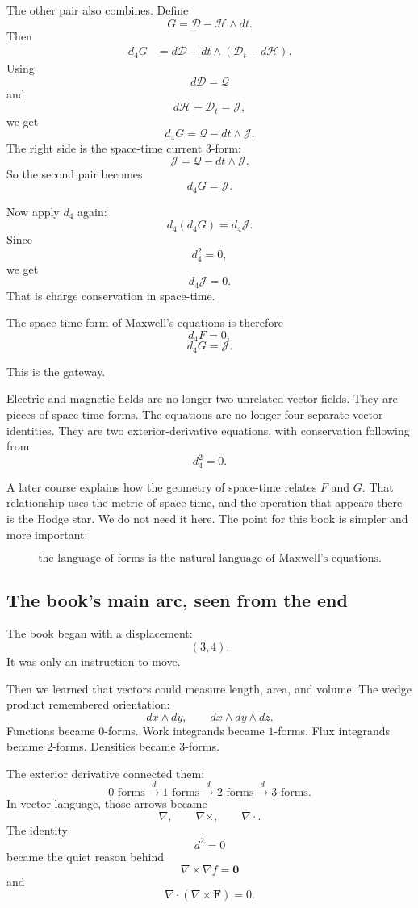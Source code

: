 The other pair also combines.  Define
\[
\boxed{
    G=\mathcal D-\mathcal H\wedge dt.
}
\]
Then
\[
\begin{aligned}
d_4G
&=
d\mathcal D
+
dt\wedge(\mathcal D_t-d\mathcal H).
\end{aligned}
\]
Using
\[
    d\mathcal D=\mathcal Q
\]
and
\[
    d\mathcal H-\mathcal D_t=\mathcal J,
\]
we get
\[
\boxed{
    d_4G=\mathcal Q-dt\wedge\mathcal J.
}
\]
The right side is the space-time current \(3\)-form:
\[
\boxed{
    \mathscr J=\mathcal Q-dt\wedge\mathcal J.
}
\]
So the second pair becomes
\[
\boxed{
    d_4G=\mathscr J.
}
\]

Now apply \(d_4\) again:
\[
    d_4(d_4G)=d_4\mathscr J.
\]
Since
\[
    d_4^2=0,
\]
we get
\[
\boxed{
    d_4\mathscr J=0.
}
\]
That is charge conservation in space-time.

The space-time form of Maxwell's equations is therefore
\[
\boxed{
    d_4F=0,
}
\]
\[
\boxed{
    d_4G=\mathscr J.
}
\]

This is the gateway.

Electric and magnetic fields are no longer two unrelated vector fields.  They are pieces
of space-time forms.  The equations are no longer four separate vector identities.  They
are two exterior-derivative equations, with conservation following from
\[
    d_4^2=0.
\]

A later course explains how the geometry of space-time relates \(F\) and \(G\).  That
relationship uses the metric of space-time, and the operation that appears there is the
Hodge star.  We do not need it here.  The point for this book is simpler and more
important:

\[
\boxed{
    \text{the language of forms is the natural language of Maxwell's equations.}
}
\]

\subsection{The book's main arc, seen from the end}

The book began with a displacement:
\[
    (3,4).
\]
It was only an instruction to move.

Then we learned that vectors could measure length, area, and volume.  The wedge
product remembered orientation:
\[
    dx\wedge dy,
    \qquad
    dx\wedge dy\wedge dz.
\]
Functions became \(0\)-forms.  Work integrands became \(1\)-forms.  Flux integrands
became \(2\)-forms.  Densities became \(3\)-forms.

The exterior derivative connected them:
\[
    0\text{-forms}\xrightarrow{d}1\text{-forms}
    \xrightarrow{d}2\text{-forms}
    \xrightarrow{d}3\text{-forms}.
\]
In vector language, those arrows became
\[
    \nabla,\qquad \nabla\times,\qquad \nabla\cdot.
\]
The identity
\[
    d^2=0
\]
became the quiet reason behind
\[
    \nabla\times\nabla f=\mathbf 0
\]
and
\[
    \nabla\cdot(\nabla\times\mathbf F)=0.
\]

